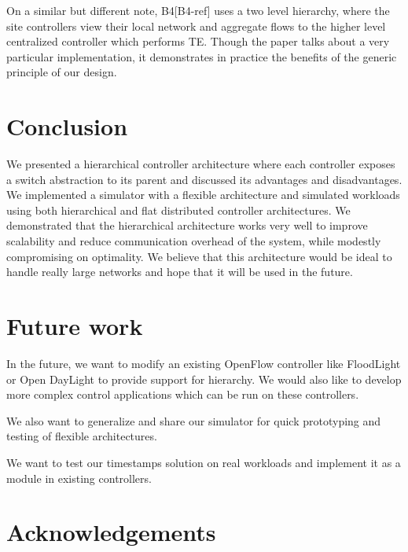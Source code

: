 \documentclass[10pt, twocolumn]{article}
\begin{document}
On a similar but different note, B4[B4-ref] uses a two level hierarchy, where the site controllers view their local network and aggregate flows to the higher level centralized controller which performs TE. Though the paper talks about a very particular implementation, it demonstrates in practice the benefits of the generic principle of our design.

\section{Conclusion}
\label{sec:conc}
We presented a hierarchical controller architecture where each controller exposes a switch abstraction to its parent and discussed its advantages and disadvantages. We implemented a simulator with a flexible architecture and simulated workloads using both hierarchical and flat distributed controller architectures. We demonstrated that the hierarchical architecture works very well to improve scalability and reduce communication overhead of the system, while modestly compromising on optimality. We believe that this architecture would be ideal to handle really large networks and hope that it will be used in the future.

\section{Future work}
In the future, we want to modify an existing OpenFlow controller like FloodLight or Open DayLight to provide support for hierarchy. We would also like to develop more complex control applications which can be run on these controllers.

We also want to generalize and share our simulator for quick prototyping and testing of flexible architectures.

We want to test our timestamps solution on real workloads and implement it as a module in existing controllers.

\section{Acknowledgements}
\label{sec:ack}



\end{document}
